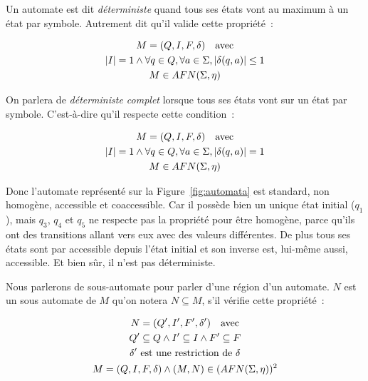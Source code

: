 \begin{definition}
    Un automate est dit \textit{déterministe} quand tous ses états vont au
    maximum à un état par symbole. Autrement dit qu'il valide cette propriété~:

    \begin{gather*}
        M = (Q, I, F, \delta) \quad \text{avec} \\
        |I| = 1 \land \forall q \in Q, \forall a \in \Sigma, | \delta(q, a) | \leq 1\\
        M \in AFN(\Sigma, \eta) \notag
    \end{gather*}

    On parlera de \textit{déterministe complet} lorsque tous ses états vont sur un
    état par symbole. C'est-à-dire qu'il respecte cette condition~:

    \begin{gather*}
        M = (Q, I, F, \delta) \quad \text{avec} \\
        |I| = 1 \land \forall q \in Q, \forall a \in \Sigma, | \delta(q, a) | = 1\\
        M \in AFN(\Sigma, \eta) \notag
    \end{gather*}
\end{definition}

\begin{example}
    Donc l'automate représenté sur la Figure~\ref{fig:automata} est standard, non
    homogène, accessible et coaccessible. Car il possède bien un unique état
    initial (\(q_1\)), mais \(q_3\), \(q_4\) et \(q_5\) ne respecte pas la
    propriété pour être homogène, parce qu'ils ont des transitions allant vers eux
    avec des valeurs différentes. De plus tous ses états sont par accessible depuis
    l'état initial et son inverse est, lui-même aussi, accessible. Et bien sûr, il
    n'est pas déterministe.
\end{example}

\begin{definition}
    Nous parlerons de sous-automate pour parler d'une \og{}région\fg{} d'un
    automate. \(N\) est un sous automate de \(M\) qu'on notera
    \(N \subseteq M\), s'il vérifie cette propriété~:

    \begin{gather*}
        N = (Q', I', F', \delta') \quad \text{avec} \\
        Q' \subseteq Q \land I' \subseteq I \land F' \subseteq F \\
        \delta' \text{ est une restriction de } \delta \\
        M = (Q, I, F, \delta) \land (M, N) \in (AFN(\Sigma, \eta))^2 \notag
    \end{gather*}
\end{definition}

